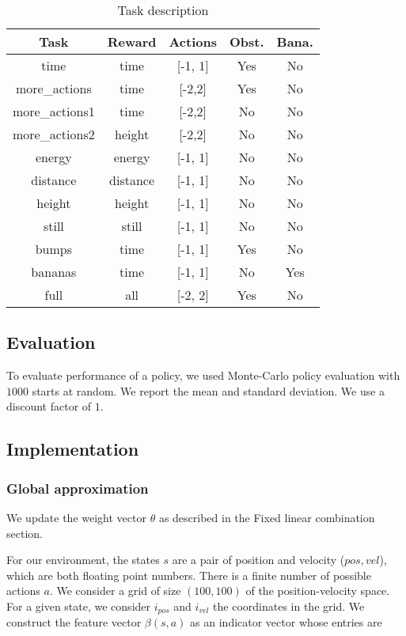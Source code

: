 \documentclass{article}
\begin{document}
\begin{table}[!hbt]
 \begin{tabular}{|c | c | c | c | c|} 
 \hline
 Task & Reward & Actions & Obst. & Bana. \\ [1ex] 
 \hline\hline
time & time & [-1, 1] & Yes & No\\ 
 \hline
more\_actions  & time & [-2,2] & Yes & No \\ [0.5ex] 
\hline
more\_actions1  & time & [-2,2] & No & No\\ \hline
more\_actions2  & height & [-2,2] & No & No\\ \hline
energy  & energy & [-1, 1] & No & No\\ \hline
distance  & distance & [-1, 1] & No & No \\ \hline
height  & height & [-1, 1] & No & No\\ \hline
still  & still & [-1, 1] & No & No\\ \hline
bumps  & time & [-1, 1] & Yes & No\\ \hline
bananas  & time & [-1, 1] & No & Yes\\ [1ex]  \hline 
full & all & [-2, 2] & Yes & No \\ \hline
\end{tabular}
\caption{Task description}
\label{table:tasks}
\end{table}

\subsection{Evaluation}

To evaluate performance of a policy, we used Monte-Carlo policy evaluation with $ 1000 $ starts at random. We report the mean and standard deviation. We use a discount factor of $ 1 $.

\subsection{Implementation}

\subsubsection{Global approximation}

We update the weight vector $\theta$ as described in the Fixed linear combination section.

For our environment, the states $s$ are a pair of position and velocity ($pos, vel$), which are both floating point numbers. There is a finite number of possible actions $a$. We consider a grid of size $ (100, 100) $ of the position-velocity space. For a given state, we consider $i_{pos} $ and $i_{vel}$ the coordinates in the grid. We construct the feature vector $\beta(s,a)$ as an indicator vector whose entries are
\end{document}
